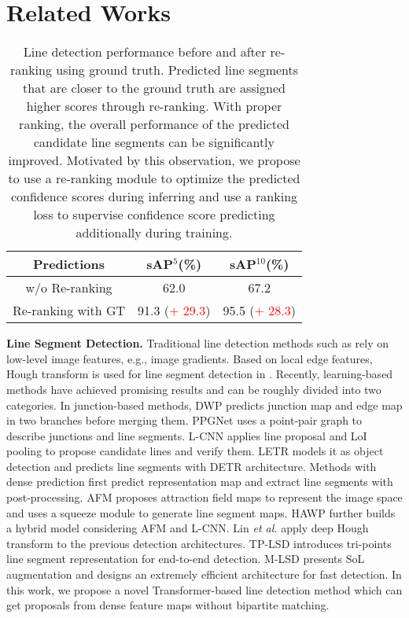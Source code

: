 \section{Related Works}
\begin{table}[tb]
    \centering
    \begin{tabular}{c c c}
        \toprule
         Predictions & sAP$^{5}$(\%) & sAP$^{10}$(\%)\\
        \midrule
         w/o Re-ranking & 62.0 & 67.2 \\
         Re-ranking with GT & 91.3 (\textcolor{red}{$+$ 29.3}) & 95.5 (\textcolor{red}{$+$ 28.3})\\
        \bottomrule
    \end{tabular}
    \caption{Line detection performance before and after re-ranking using ground truth. Predicted line segments that are closer to the ground truth are assigned higher scores through re-ranking. With proper ranking, the overall performance of the predicted candidate line segments can be significantly improved. Motivated by this observation, we propose to use a re-ranking module to optimize the predicted confidence scores during inferring and use a ranking loss to supervise confidence score predicting additionally during training.}
    \label{tab:w/o ranking}
\end{table}

\textbf{Line Segment Detection.} Traditional line detection methods such as \cite{von2008lsd,akinlar2011edlines,lu2015cannylines} rely on low-level image features, e.g., image gradients. Based on local edge features, Hough transform is used for line segment detection in \cite{guil1995fast,furukawa2003accurate,xu2015closed}.
Recently, learning-based methods have achieved promising results and can be roughly divided into two categories. In junction-based methods, DWP \cite{huang2018learning} predicts junction map and edge map in two branches before merging them. PPGNet \cite{zhang2019ppgnet} uses a point-pair graph to describe junctions and line segments. L-CNN \cite{zhou2019end} applies line proposal and LoI pooling to propose candidate lines and verify them. LETR \cite{xu2021line} models it as object detection and predicts line segments with DETR architecture. 
Methods with dense prediction first predict representation map and extract line segments with post-processing. AFM \cite{xue2019learning} proposes attraction field maps to represent the image space and uses a squeeze module to generate line segment maps. HAWP \cite{xue2020holistically} further builds a hybrid model considering AFM and L-CNN. Lin \textit{et al.} \cite{lin2020deep} apply deep Hough transform to the previous detection architectures. TP-LSD \cite{huang2020tp} introduces tri-points line segment representation for end-to-end detection. M-LSD \cite{gu2022towards} presents SoL augmentation and designs an extremely efficient architecture for fast detection.
In this work, we propose a novel Transformer-based line detection method which can get proposals from dense feature maps without bipartite matching.

